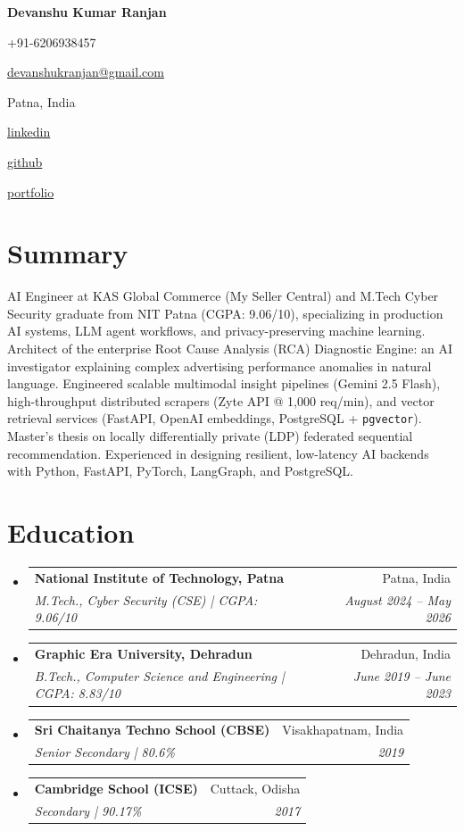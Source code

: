 \documentclass[letterpaper,10pt]{article}
\makeatletter
\newcommand{\contacttag}[2]{%
  \colorbox{tagbg}{\strut\hspace{6pt}#1\hspace{4pt}#2\hspace{6pt}}%
}
\newcommand{\resumeSubheading}[4]{
\vspace{-1pt}\item
  \begin{tabular*}{0.97\textwidth}[t]{l@{\extracolsep{\fill}}r}
    \textbf{#1} & #2 \\
    \textit{#3} & \textit{#4} \\
  \end{tabular*}\vspace{-7pt}
}
\newcommand{\resumeSubHeadingList}{\begin{itemize}[leftmargin=0.15in, label={}]}
\newcommand{\resumeSubHeadingListEnd}{\end{itemize}}
\makeatother
\begin{document}
\begin{center}
  \textbf{\Huge Devanshu Kumar Ranjan} \\
  \vspace{4pt}
  \footnotesize
  \contacttag{}{+91-6206938457}\hspace{3pt}
  \contacttag{}{\href{mailto:devanshukranjan@gmail.com}{devanshukranjan@gmail.com}}\hspace{3pt}
  \contacttag{}{Patna, India}\hspace{3pt}
  \contacttag{}{\href{https://linkedin.com/in/devanshu-kumar-ranjan-06399221b}{linkedin}}\hspace{3pt}
  \contacttag{}{\href{https://github.com/devanshukranjan}{github}}\hspace{3pt}
  \contacttag{}{\href{https://devanshukranjan.github.io/Cybersecurity-Portfolio/}{portfolio}}
\end{center}

\section{Summary}
\small
AI Engineer at KAS Global Commerce (My Seller Central) and M.Tech Cyber Security graduate from NIT Patna (CGPA: 9.06/10), specializing in production AI systems, LLM agent workflows, and privacy-preserving machine learning. Architect of the enterprise Root Cause Analysis (RCA) Diagnostic Engine: an AI investigator explaining complex advertising performance anomalies in natural language. Engineered scalable multimodal insight pipelines (Gemini 2.5 Flash), high-throughput distributed scrapers (Zyte API @ 1,000 req/min), and vector retrieval services (FastAPI, OpenAI embeddings, PostgreSQL + \texttt{pgvector}). Master's thesis on locally differentially private (LDP) federated sequential recommendation. Experienced in designing resilient, low-latency AI backends with Python, FastAPI, PyTorch, LangGraph, and PostgreSQL.
\normalsize

\section{Education}
\resumeSubHeadingList
  \resumeSubheading
      {National Institute of Technology, Patna}{Patna, India}
      {M.Tech., Cyber Security (CSE) | CGPA: 9.06/10}{August 2024 -- May 2026}
  \resumeSubheading
      {Graphic Era University, Dehradun}{Dehradun, India}
      {B.Tech., Computer Science and Engineering | CGPA: 8.83/10}{June 2019 -- June 2023}
  \resumeSubheading
      {Sri Chaitanya Techno School (CBSE)}{Visakhapatnam, India}{Senior Secondary | 80.6\%}{2019}
  \resumeSubheading
      {Cambridge School (ICSE)}{Cuttack, Odisha}{Secondary | 90.17\%}{2017}
\resumeSubHeadingListEnd
\end{document}

